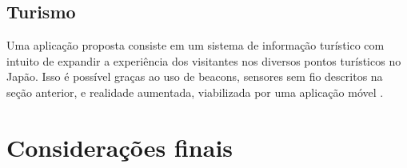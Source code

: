 \documentclass[
	article,			%
	11pt,				%
	oneside,			%
	a4paper,			%
	section=TITLE,		%
	subsection=TITLE,	%
	english,			%
	brazil,				%
	sumario=tradicional
	]{abntex2}
\begin{document}
\subsection{Turismo}
Uma aplicação proposta consiste em um sistema de informação turístico com intuito de expandir a experiência dos visitantes nos diversos pontos turísticos no Japão. Isso é possível graças ao uso de beacons, sensores sem fio descritos na seção anterior, e realidade 
aumentada, viabilizada por uma aplicação móvel \cite{SHIBATA2016}. 


% 

\section*{Considerações finais}







\end{document}
